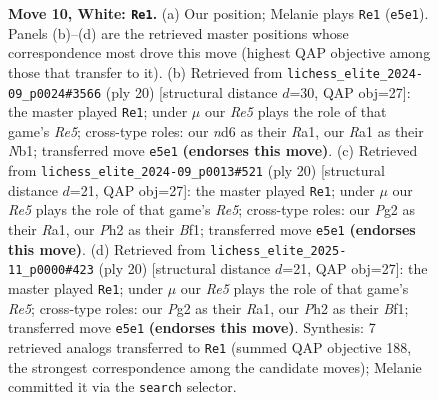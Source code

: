 \documentclass[11pt]{article}
\begin{document}
\begin{figure}[p]
\caption{\textbf{Move 10, White: \texttt{Re1}.} (a) Our position; Melanie plays \texttt{Re1} (\texttt{e5e1}). Panels (b)--(d) are the retrieved master positions whose correspondence most drove this move (highest QAP objective among those that transfer to it). (b) Retrieved from \texttt{lichess\_elite\_2024-09\_p0024\#3566} (ply 20) [structural distance $d$=30, QAP obj=27]: the master played \texttt{Re1}; under $\mu$ our \emph{Re5} plays the role of that game's \emph{Re5}; cross-type roles: our \emph{n}d6 as their \emph{R}a1, our \emph{R}a1 as their \emph{N}b1; transferred move \texttt{e5e1} \textbf{(endorses this move)}. (c) Retrieved from \texttt{lichess\_elite\_2024-09\_p0013\#521} (ply 20) [structural distance $d$=21, QAP obj=27]: the master played \texttt{Re1}; under $\mu$ our \emph{Re5} plays the role of that game's \emph{Re5}; cross-type roles: our \emph{P}g2 as their \emph{R}a1, our \emph{P}h2 as their \emph{B}f1; transferred move \texttt{e5e1} \textbf{(endorses this move)}. (d) Retrieved from \texttt{lichess\_elite\_2025-11\_p0000\#423} (ply 20) [structural distance $d$=21, QAP obj=27]: the master played \texttt{Re1}; under $\mu$ our \emph{Re5} plays the role of that game's \emph{Re5}; cross-type roles: our \emph{P}g2 as their \emph{R}a1, our \emph{P}h2 as their \emph{B}f1; transferred move \texttt{e5e1} \textbf{(endorses this move)}. Synthesis: 7 retrieved analogs transferred to \texttt{Re1} (summed QAP objective 188, the strongest correspondence among the candidate moves); Melanie committed it via the \texttt{search} selector.}
\label{fig:thought-m18}
\end{figure}

\clearpage
\end{document}
